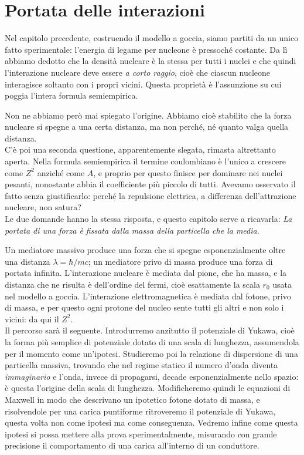\chapter{Portata delle interazioni}

Nel capitolo precedente, costruendo il modello a goccia, siamo partiti da un unico fatto sperimentale: l'energia di legame per nucleone è pressoché costante. Da lì abbiamo dedotto che la densità nucleare è la stessa per tutti i nuclei e che quindi l'interazione nucleare deve essere \emph{a corto raggio}, cioè che ciascun nucleone interagisce soltanto con i propri vicini. Questa proprietà è l'assunzione su cui poggia l'intera formula semiempirica.

Non ne abbiamo però mai spiegato l'origine. Abbiamo cioè stabilito che la forza nucleare si spegne a una certa distanza, ma non perché, né quanto valga quella distanza.\\

C'è poi una seconda questione, apparentemente slegata, rimasta altrettanto aperta. Nella formula semiempirica il termine coulombiano è l'unico a crescere come $Z^2$ anziché come $A$, e proprio per questo finisce per dominare nei nuclei pesanti, nonostante abbia il coefficiente più piccolo di tutti. Avevamo osservato il fatto senza giustificarlo: perché la repulsione elettrica, a differenza dell'attrazione nucleare, non satura?\\

Le due domande hanno la stessa risposta, e questo capitolo serve a ricavarla: \emph{La portata di una forza è fissata dalla massa della particella che la media}.

Un mediatore massivo produce una forza che si spegne esponenzialmente oltre una distanza $\lambda = \hbar/mc$; un mediatore privo di massa produce una forza di portata infinita. L'interazione nucleare è mediata dal pione, che ha massa, e la distanza che ne risulta è dell'ordine del fermi, cioè esattamente la scala $r_0$ usata nel modello a goccia. L'interazione elettromagnetica è mediata dal fotone, privo di massa, e per questo ogni protone del nucleo sente tutti gli altri e non solo i vicini: da qui il $Z^2$.\\

Il percorso sarà il seguente. Introdurremo anzitutto il potenziale di Yukawa, cioè la forma più semplice di potenziale dotato di una scala di lunghezza, assumendola per il momento come un'ipotesi. Studieremo poi la relazione di dispersione di una particella massiva, trovando che nel regime statico il numero d'onda diventa \emph{immaginario} e l'onda, invece di propagarsi, decade esponenzialmente nello spazio: è questa l'origine della scala di lunghezza. Modificheremo quindi le equazioni di Maxwell in modo che descrivano un ipotetico fotone dotato di massa, e risolvendole per una carica puntiforme ritroveremo il potenziale di Yukawa, questa volta non come ipotesi ma come conseguenza. Vedremo infine come questa ipotesi si possa mettere alla prova sperimentalmente, misurando con grande precisione il comportamento di una carica all'interno di un conduttore.

